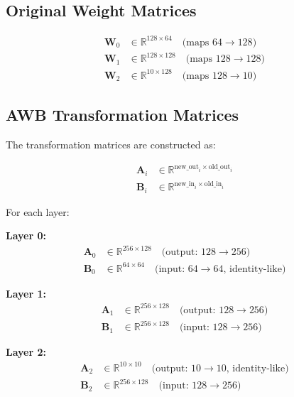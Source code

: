 \documentclass[11pt]{article}
\begin{document}
\subsection{Original Weight Matrices}

\begin{align}
\mathbf{W}_0 &\in \mathbb{R}^{128 \times 64} \quad \text{(maps $64 \rightarrow 128$)} \\
\mathbf{W}_1 &\in \mathbb{R}^{128 \times 128} \quad \text{(maps $128 \rightarrow 128$)} \\
\mathbf{W}_2 &\in \mathbb{R}^{10 \times 128} \quad \text{(maps $128 \rightarrow 10$)}
\end{align}

\subsection{AWB Transformation Matrices}

The transformation matrices are constructed as:

\begin{align}
\mathbf{A}_i &\in \mathbb{R}^{\text{new\_out}_i \times \text{old\_out}_i} \\
\mathbf{B}_i &\in \mathbb{R}^{\text{new\_in}_i \times \text{old\_in}_i}
\end{align}

For each layer:

\textbf{Layer 0:}
\begin{align}
\mathbf{A}_0 &\in \mathbb{R}^{256 \times 128} \quad \text{(output: $128 \rightarrow 256$)} \\
\mathbf{B}_0 &\in \mathbb{R}^{64 \times 64} \quad \text{(input: $64 \rightarrow 64$, identity-like)}
\end{align}

\textbf{Layer 1:}
\begin{align}
\mathbf{A}_1 &\in \mathbb{R}^{256 \times 128} \quad \text{(output: $128 \rightarrow 256$)} \\
\mathbf{B}_1 &\in \mathbb{R}^{256 \times 128} \quad \text{(input: $128 \rightarrow 256$)}
\end{align}

\textbf{Layer 2:}
\begin{align}
\mathbf{A}_2 &\in \mathbb{R}^{10 \times 10} \quad \text{(output: $10 \rightarrow 10$, identity-like)} \\
\mathbf{B}_2 &\in \mathbb{R}^{256 \times 128} \quad \text{(input: $128 \rightarrow 256$)}
\end{align}
\end{document}
